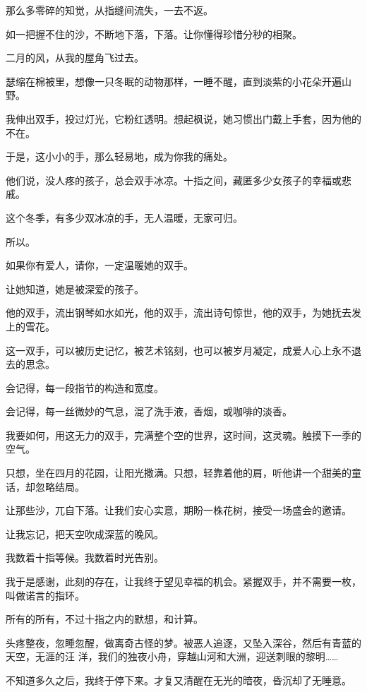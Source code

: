 		那么多零碎的知觉，从指缝间流失，一去不返。

		如一把握不住的沙，不断地下落，下落。让你懂得珍惜分秒的相聚。


		二月的风，从我的屋角飞过去。

		瑟缩在棉被里，想像一只冬眠的动物那样，一睡不醒，直到淡紫的小花朵开遍山野。

		我伸出双手，投过灯光，它粉红透明。想起枫说，她习惯出门戴上手套，因为他的不在。

		于是，这小小的手，那么轻易地，成为你我的痛处。

		他们说，没人疼的孩子，总会双手冰凉。十指之间，藏匿多少女孩子的幸福或悲戚。

		这个冬季，有多少双冰凉的手，无人温暖，无家可归。


		所以。

		如果你有爱人，请你，一定温暖她的双手。

		让她知道，她是被深爱的孩子。


		他的双手，流出钢琴如水如光，他的双手，流出诗句惊世，他的双手，为她抚去发上的雪花。

		这一双手，可以被历史记忆，被艺术铭刻，也可以被岁月凝定，成爱人心上永不退去的思念。


		会记得，每一段指节的构造和宽度。

		会记得，每一丝微妙的气息，混了洗手液，香烟，或咖啡的淡香。


		我要如何，用这无力的双手，完满整个空的世界，这时间，这灵魂。触摸下一季的空气。

		只想，坐在四月的花园，让阳光撒满。只想，轻靠着他的肩，听他讲一个甜美的童话，却忽略结局。


		让那些沙，兀自下落。让我们安心实意，期盼一株花树，接受一场盛会的邀请。

		让我忘记，把天空吹成深蓝的晚风。


		我数着十指等候。我数着时光告别。

		我于是感谢，此刻的存在，让我终于望见幸福的机会。紧握双手，并不需要一枚，叫做诺言的指环。

		所有的所有，不过十指之内的默想，和计算。

	\endwriting



		头疼整夜，忽睡忽醒，做离奇古怪的梦。被恶人追逐，又坠入深谷，然后有青蓝的天空，无涯的汪
	洋，我们的独夜小舟，穿越山河和大洲，迎送刺眼的黎明……

		不知道多久之后，我终于停下来。才复又清醒在无光的暗夜，昏沉却了无睡意。

